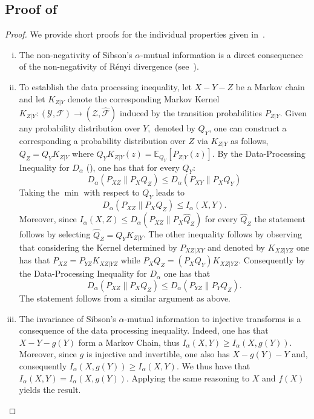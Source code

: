 \documentclass{article}
\numberwithin{theorem}{section}
\numberwithin{example}{section}
\numberwithin{remark}{section}
\numberwithin{definition}{section}
\newcommand{\E}{\mathbb{E}}
\begin{document}
\subsection{Proof of~}\label{app:proof:thm:properties}
\begin{proof}
We provide short proofs for the individual properties given in~.
    \begin{enumerate}[i)]
        \item The non-negativity of Sibson's $\alpha$-mutual information is a direct consequence of the non-negativity of R\'enyi divergence (see~\cite[Theorem 8]{renyiDiv}).
        \item To establish the data processing inequality, let $X-Y-Z$ be a Markov chain and let $K_{Z|Y}$ denote the corresponding Markov Kernel $K_{Z|Y}:(\mathcal{Y},\mathcal{F}) \to (\mathcal{Z},\mathcal{\hat{F}})$ induced by the transition probabilities $P_{Z|Y}$. Given any probability distribution over $Y,$ denoted by $Q_Y$, one can construct a corresponding a probability distribution over $Z$ via $K_{Z|Y}$ as follows, $Q_Z=Q_Y K_{Z|Y}$ where  $Q_Y K_{Z|Y}(z)=\E_{Q_Y}[P_{Z|Y}(z)]$. By the Data-Processing Inequality for $D_\alpha$ (\cite[Theorem 1]{renyiDiv}), one has that for every $Q_Y$:
\begin{equation}
    D_\alpha(P_{XZ}\|P_XQ_Z) \leq D_\alpha(P_{XY}\|P_XQ_Y)
\end{equation}
Taking the $\min$ with respect to $Q_Y$ leads to 
\begin{equation}
    D_\alpha(P_{XZ}\|P_XQ_Z) \leq I_\alpha(X,Y).
\end{equation}
Moreover, since $I_\alpha(X,Z) \leq D_\alpha(P_{XZ}\| P_X \hat{Q}_Z)$ for every $\hat{Q}_Z$ the statement follows by selecting $\hat{Q}_Z=Q_YK_{Z|Y}$. 
The other inequality follows by observing that considering the Kernel determined by $P_{XZ|XY}$ and denoted by $K_{XZ|YZ}$ one has that $P_{XZ}=P_{YZ}K_{XZ|YZ}$ while $P_XQ_Z = (P_XQ_Y)K_{XZ|YZ}$. Consequently by the Data-Processing Inequality for $D_\alpha$ one has that 
\begin{equation}
    D_\alpha(P_{XZ}\|P_XQ_Z) \leq D_\alpha(P_{YZ}\|P_YQ_Z).
\end{equation}
The statement follows from a similar argument as above.
        \item The invariance of Sibson's $\alpha$-mutual information to injective transforms is a consequence of the data processing inequality. Indeed, one has that $X-Y-g(Y)$ form a Markov Chain, thus $I_\alpha(X,Y)\geq I_\alpha(X,g(Y))$. Moreover, since $g$ is injective and invertible, one also has $X-g(Y)-Y$ and, consequently $I_\alpha(X,g(Y))\geq I_\alpha(X,Y)$. We thus have that $I_\alpha(X,Y)=I_\alpha(X,g(Y))$. Applying the same reasoning to $X$ and $f(X)$ yields the result.
        

\end{enumerate}
\end{proof}
\end{document}
